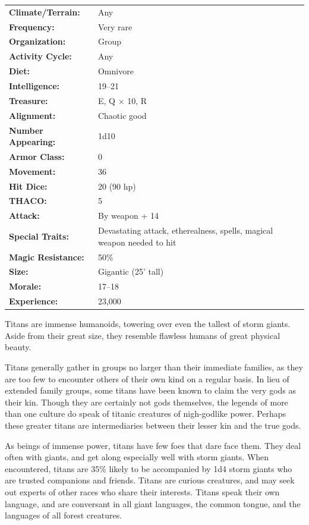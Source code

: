 \begin{multicols}{2}
\begin{minipage}{\columnwidth}
\noindent \begin{tabular}{p{}p{}}
\textbf{Climate/Terrain:}	& Any	\\
\textbf{Frequency:} 		& Very rare	\\
\textbf{Organization:} 		& Group	\\
\textbf{Activity Cycle:} 	& Any	\\
\textbf{Diet:} 				& Omnivore	\\
\textbf{Intelligence:} 		& 19--21	\\
\textbf{Treasure:} 			& E, Q $\times$ 10, R	\\
\textbf{Alignment:} 		& Chaotic good	\\
\hline
\textbf{Number Appearing:} 	& 1d10	\\
\textbf{Armor Class:} 		& 0	\\
\textbf{Movement:} 			& 36	\\
\textbf{Hit Dice:} 			& 20 (90 hp)	\\
\textbf{THACO:} 			& 5	\\
\textbf{Attack:} 			& By weapon + 14	\\
\textbf{Special Traits:} & Devastating attack, etherealness, spells, magical weapon needed to hit	\\
\textbf{Magic Resistance:} 	& 50\%	\\
\textbf{Size:} 				& Gigantic (25' tall)	\\
\textbf{Morale:} 			& 17--18	\\
\textbf{Experience:} 		& 23,000	\\ %
\end{tabular}

\end{minipage}

Titans are immense humanoids, towering over even the tallest of storm giants. Aside from their great size, they resemble flawless humans of great physical beauty.

Titans generally gather in groups no larger than their immediate families, as they are too few to encounter others of their own kind on a regular basis. In lieu of extended family groups, some titans have been known to claim the very gods as their kin. Though they are certainly not gods themselves, the legends of more than one culture do speak of titanic creatures of nigh-godlike power. Perhaps these greater titans are intermediaries between their lesser kin and the true gods.

As beings of immense power, titans have few foes that dare face them. They deal often with giants, and get along especially well with storm giants. When encountered, titans are 35\% likely to be accompanied by 1d4 storm giants who are trusted companions and friends. Titans are curious creatures, and may seek out experts of other races who share their interests. Titans speak their own language, and are conversant in all giant languages, the common tongue, and the languages of all forest creatures.


\end{multicols}
